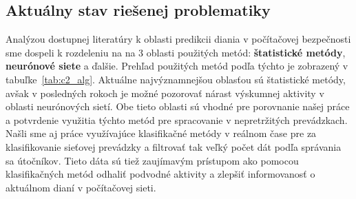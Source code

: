\documentclass[thesismargins, thesislinespacing, openright, upjsfrontpage, combineabstracts]{rnthesis}
\begin{document}
\subsection{Aktuálny stav riešenej problematiky}

Analýzou dostupnej literatúry k oblasti predikcii diania v počítačovej bezpečnosti sme dospeli k rozdeleniu na na 3 oblasti použitých metód:
\textbf{štatistické metódy}, \textbf{neurónové siete} a ďalšie. Prehľad použitých metód podľa týchto je zobrazený v tabuľke~\ref{tab:c2_alg}. Aktuálne najvýznamnejšou oblasťou sú štatistické metódy, avšak v posledných rokoch je možné pozorovať nárast výskumnej aktivity v oblasti neurónových sietí. Obe tieto oblasti sú vhodné pre porovnanie našej práce a potvrdenie využitia týchto metód pre spracovanie v nepretržitých prevádzkach. Našli sme aj práce využívajúce klasifikačné metódy v reálnom čase pre za klasifikovanie sieťovej prevádzky a filtrovať tak veľký počet dát podľa správania sa útočníkov. Tieto dáta sú tiež zaujímavým prístupom ako pomocou klasifikačných metód odhaliť podvodné aktivity a zlepšiť informovanosť o aktuálnom dianí v počítačovej sieti.
\end{document}
